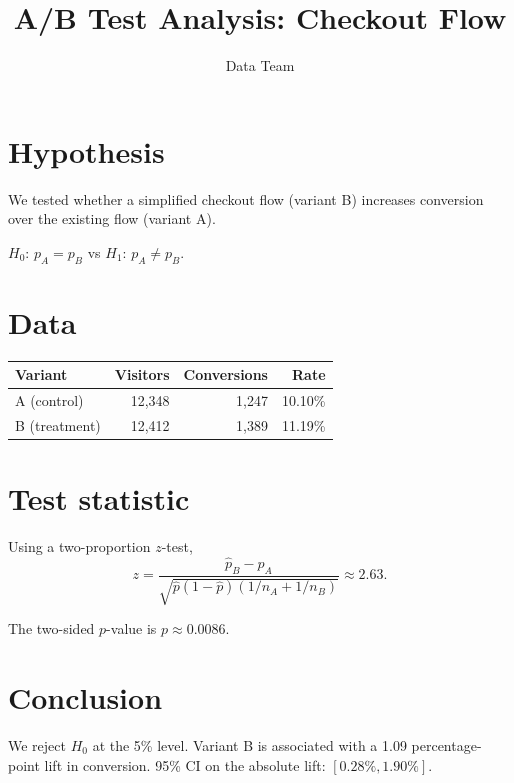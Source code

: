 \documentclass{article}
\title{A/B Test Analysis: Checkout Flow}
\author{Data Team}
\begin{document}
\maketitle

\section{Hypothesis}
We tested whether a simplified checkout flow (variant B) increases conversion over the existing flow (variant A).

$H_0$: $p_A = p_B$ vs $H_1$: $p_A \neq p_B$.

\section{Data}

\begin{tabular}{lrrr}
  \toprule
  Variant & Visitors & Conversions & Rate \\
  \midrule
  A (control) & 12{,}348 & 1{,}247 & 10.10\% \\
  B (treatment) & 12{,}412 & 1{,}389 & 11.19\% \\
  \bottomrule
\end{tabular}

\section{Test statistic}
Using a two-proportion $z$-test,
\[
  z = \frac{\hat p_B - \hat p_A}{\sqrt{\hat p(1-\hat p)(1/n_A + 1/n_B)}} \approx 2.63.
\]

The two-sided $p$-value is $p \approx 0.0086$.

\section{Conclusion}
We reject $H_0$ at the 5\% level. Variant B is associated with a 1.09 percentage-point lift in conversion. 95\% CI on the absolute lift: $[0.28\%, 1.90\%]$.
\end{document}
